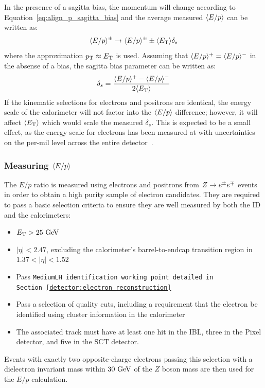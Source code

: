 In the presence of a sagitta bias, the momentum will change according to Equation~\ref{eq:align_p_sagitta_bias} and the average measured $\langle E/p\rangle$ can be written as:
\begin{equation}
  \langle E/p\rangle^{\pm}\rightarrow\langle E/p\rangle^{\pm}\pm\langle E_{\mathrm{T}}\rangle\delta_s
\end{equation}
where the approximation $p_{\mathrm{T}}\approx E_{\mathrm{T}}$ is used.
Assuming that $\langle E/p\rangle^+ = \langle E/p\rangle^-$ in the absense of a bias, the sagitta bias parameter can be written as:
\begin{equation}
  \delta_s = \frac{\eop^+ - \eop^-}{2\langle\et\rangle}
\label{eq:align_eop_sagitta}
\end{equation}
If the kinematic selections for electrons and positrons are identical, the energy scale of the calorimeter will not factor into the $\langle E/p\rangle$ difference; however, it will affect $\langle E_{\mathrm{T}}\rangle$ which would scale the measured $\delta_s$.
This is expected to be a small effect, as the energy scale for electrons has been measured at  with uncertainties on the per-mil level across the entire detector~\cite{2016.electron-photon-calibration}.

\subsubsection{Measuring $\langle E/p\rangle$}
The $E/p$ ratio is measured using electrons and positrons from $Z\rightarrow e^{\pm}e^{\mp}$ events in order to obtain a high purity sample of electron candidates.
They are required to pass a basic selection criteria to ensure they are well measured by both the ID and the calorimeters:
\begin{itemize}
  \item $\et > 25\gev$
  \item $|\eta| < 2.47$, excluding the calorimeter's barrel-to-endcap transition region in $1.37<|\eta|<1.52$
  \item Pass \tt{MediumLH} identification working point detailed in Section~\ref{detector:electron_reconstruction}
  \item Pass a selection of quality cuts, including a requirement that the electron be identified using cluster information in the calorimeter %
  \item The associated track must have at least one hit in the IBL, three in the Pixel detector, and five in the SCT detector.
\end{itemize}
Events with exactly two opposite-charge electrons passing this selection with a dielectron invariant mass within $30\gev$ of the $Z$ boson mass are then used for the $E/p$ calculation.

